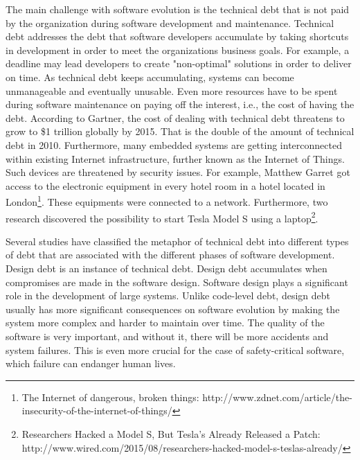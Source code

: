 The main challenge with software evolution is the technical debt that is not paid by the organization during software development and maintenance. Technical debt addresses the debt that software developers accumulate by taking shortcuts in development in order to meet the organizations business goals. For example, a deadline may lead developers to create "non-optimal" solutions in order to deliver on time. As technical debt keeps accumulating, systems can become unmanageable and eventually unusable. Even more resources have to be spent during software maintenance on paying off the interest, i.e., the cost of having the debt. According to Gartner\cite{gartner2010}, the cost of dealing with technical debt threatens to grow to \$1 trillion globally by 2015. That is the double of the amount of technical debt in 2010. Furthermore, many embedded systems are getting interconnected within existing Internet infrastructure, further known as the Internet of Things. Such devices are threatened by security issues. For example, Matthew Garret got access to the electronic equipment in every hotel room in a hotel located in London\footnote{The Internet of dangerous, broken things: http://www.zdnet.com/article/the-insecurity-of-the-internet-of-things/}. These equipments were connected to a network. Furthermore, two research discovered the possibility to start Tesla Model S using a laptop\footnote{Researchers Hacked a Model S, But Tesla's Already Released a Patch: http://www.wired.com/2015/08/researchers-hacked-model-s-teslas-already/}.

Several studies have classified the metaphor of technical debt into different types of debt that are associated with the different phases of software development\cite{li2015systematic,p8-codabux,foser076-brown,tom2013exploration,Zazworka:2011:PDD:1985362.1985372,Zazworka:2013:CSE:2460999.2461005}. Design debt is an instance of technical debt. Design debt accumulates when compromises are made in the software design. Software design plays a significant role in the development of large systems\cite{krutchen}. Unlike code-level debt, design debt usually has more significant consequences on software evolution by making the system more complex and harder to maintain over time\cite{mo2013mapping,izurieta2007software}. The quality of the software is very important, and without it, there will be more accidents and system failures. This is even more crucial for the case of safety-critical software, which failure can endanger human lives.



